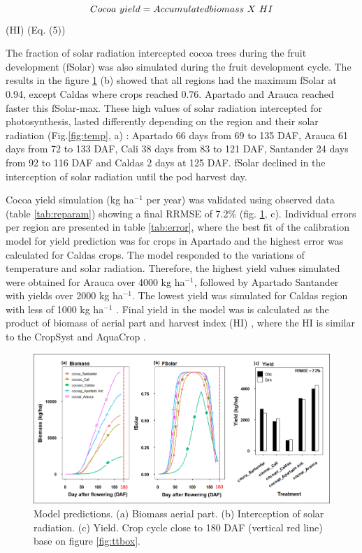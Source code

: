 \documentclass[gene,journal,article,submit,moreauthors,pdftex]{Definitions/mdpi}
\begin{document}
\begin{equation}
Cocoa~yield = Accumulated biomass~X ~ HI \\
\label{equ:HI}
\end{equation}
(HI) (Eq. (5)) 


{\color{olive} The fraction of solar radiation intercepted cocoa trees during the fruit development (fSolar) was also simulated during the fruit development cycle. The results in the figure \ref{fig:m1} (b) showed that} all regions had the maximum fSolar at 0.94, except Caldas where crops reached 0.76.  Apartado and Arauca reached faster this fSolar-max. These high values of solar radiation intercepted for photosynthesis, lasted differently depending on the region and their solar radiation (Fig.\ref{fig:temp}, a) : Apartado 66 days  from  69 to 135 DAF,  Arauca 61 days from 72 to 133 DAF, Cali 38 days from 83 to 121 DAF,  Santander 24 days from 92 to 116 DAF and Caldas 2 days at 125 DAF. fSolar declined in the interception of solar radiation until the pod harvest day. 

Cocoa yield simulation (kg ha$^{-1}$ per year) was validated using observed data (table \ref{tab:reparam}) showing a final RRMSE of 7.2\% (fig. \ref{fig:m1}, c). Individual errors per region are presented in table \ref{tab:error}, where the best fit of the calibration model  for yield prediction  was for crops in  Apartado and the highest error was calculated for Caldas crops.  The model responded to the variations of temperature and solar radiation. Therefore, the highest  yield values simulated were obtained for Arauca over 4000 kg ha$^{-1}$, followed by Apartado Santander with yields over 2000 kg ha$^{-1}$.  The lowest yield was simulated for Caldas region with less of 1000 kg ha$^{-1}$ . Final yield in the model was is calculated as the product of biomass of aerial part and harvest index (HI) \citep{Zao2019simple, Amir1991}, where the HI is similar to the CropSyst \citep{STOCKLE2003} and AquaCrop \cite{Steduto2009}. 

\begin{figure}[h!]
	\centering
	\includegraphics[scale=0.4]{images/outmodel.png}
	\caption{\footnotesize {Model predictions. (a) Biomass aerial part. (b) Interception of solar radiation. (c) Yield. Crop cycle close to 180 DAF (vertical red line) base on figure  \ref{fig:ttbox}.  \\ }} 
	\label{fig:m1}
\end{figure}
 
\end{document}
